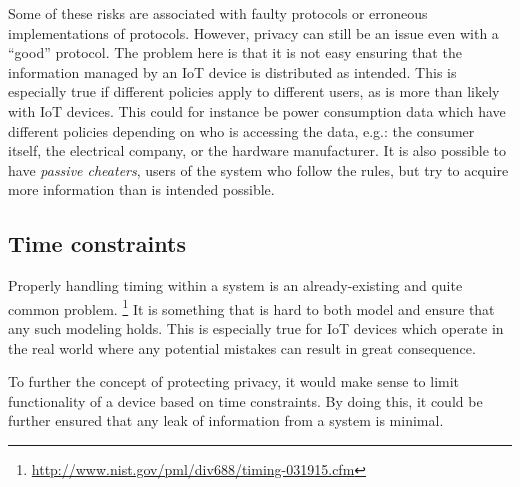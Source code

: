 Some of these risks are associated with faulty protocols or erroneous implementations of protocols.
However, privacy can still be an issue even with a ``good'' protocol.
The problem here is that it is not easy ensuring that the information managed by an IoT device is distributed as intended.
This is especially true if different policies apply to different users, as is more than likely with IoT devices.
This could for instance be power consumption data which have different policies depending on who is accessing the data, e.g.: the consumer itself, the electrical company, or the hardware manufacturer.
It is also possible to have \emph{passive cheaters}, users of the system who follow the rules, but try to acquire more information than is intended possible.

\subsection{Time constraints}
Properly handling timing within a system is an already-existing and quite common problem.
\footnote{\url{http://www.nist.gov/pml/div688/timing-031915.cfm}}
It is something that is hard to both model and ensure that any such modeling holds.
This is especially true for IoT devices which operate in the real world where any potential mistakes can result in great consequence.

To further the concept of protecting privacy, it would make sense to limit functionality of a device based on time constraints.
By doing this, it could be further ensured that any leak of information from a system is minimal.

